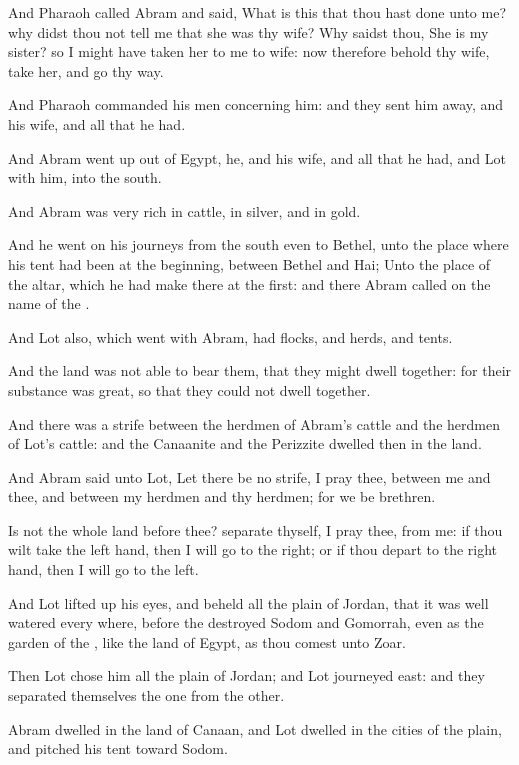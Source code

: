 \Verse And Pharaoh called Abram and said, What is this that thou hast done unto me? why didst thou not tell me that she was thy wife?  \Verse Why saidst thou, She is my sister? so I might have taken her to me to wife: now therefore behold thy wife, take her, and go thy way.

\Verse And Pharaoh commanded his men concerning him: and they sent him away, and his wife, and all that he had.

\Chapter
\Verse And Abram went up out of Egypt, he, and his wife, and all that he had, and Lot with him, into the south.

\Verse And Abram was very rich in cattle, in silver, and in gold.

\Verse And he went on his journeys from the south even to Bethel, unto the place where his tent had been at the beginning, between Bethel and Hai; \Verse Unto the place of the altar, which he had make there at the first: and there Abram called on the name of the \LORD.

\Verse And Lot also, which went with Abram, had flocks, and herds, and tents.

\Verse And the land was not able to bear them, that they might dwell together: for their substance was great, so that they could not dwell together.

\Verse And there was a strife between the herdmen of Abram's cattle and the herdmen of Lot's cattle: and the Canaanite and the Perizzite dwelled then in the land.

\Verse And Abram said unto Lot, Let there be no strife, I pray thee, between me and thee, and between my herdmen and thy herdmen; for we be brethren.

\Verse Is not the whole land before thee? separate thyself, I pray thee, from me: if thou wilt take the left hand, then I will go to the right; or if thou depart to the right hand, then I will go to the left.

\Verse And Lot lifted up his eyes, and beheld all the plain of Jordan, that it was well watered every where, before the \LORD destroyed Sodom and Gomorrah, even as the garden of the \LORD, like the land of Egypt, as thou comest unto Zoar.

\Verse Then Lot chose him all the plain of Jordan; and Lot journeyed east: and they separated themselves the one from the other.

\Verse Abram dwelled in the land of Canaan, and Lot dwelled in the cities of the plain, and pitched his tent toward Sodom.

